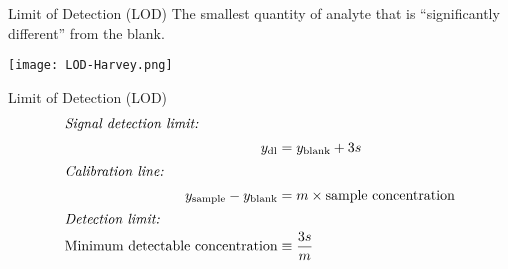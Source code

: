 \documentclass[handout]{beamer}
\begin{document}
\begin{frame}{Limit of Detection (LOD)}
	The smallest quantity of analyte that is ``significantly different''
	from the blank.

		\begin{center}
			\texttt{[image: LOD-Harvey.png]}
		\end{center}
	\end{frame}

\begin{frame}{Limit of Detection (LOD)}
	\begin{align*}
		\intertext{\textit{Signal detection limit:}}
		y_\text{dl} &= y_\text{blank} + 3s \\
		\intertext{\textit{Calibration line:}}
		y_\text{sample} - y_\text{blank} &= m \times \text{sample
		concentration} \\
		\intertext{\textit{Detection limit:}}
		\text{Minimum detectable concentration} &\equiv \dfrac{3s}{m}
	\end{align*}
\end{frame}

\end{document}
